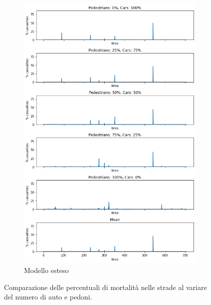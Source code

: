 \begin{figure}[ht]
    \hfill
    \begin{subfigure}{0.475\textwidth}
        \centering
        \includegraphics[width=\textwidth]{images/analisi/new_links_casualties}
        \caption{Modello esteso}
        \label{fig:new-link-casualties}
    \end{subfigure}
    \caption{Comparazione delle percentuali di mortalità nelle strade al variare del numero di auto e pedoni.}
    \label{fig:analisi-comparison-critical-links1}
\end{figure}

